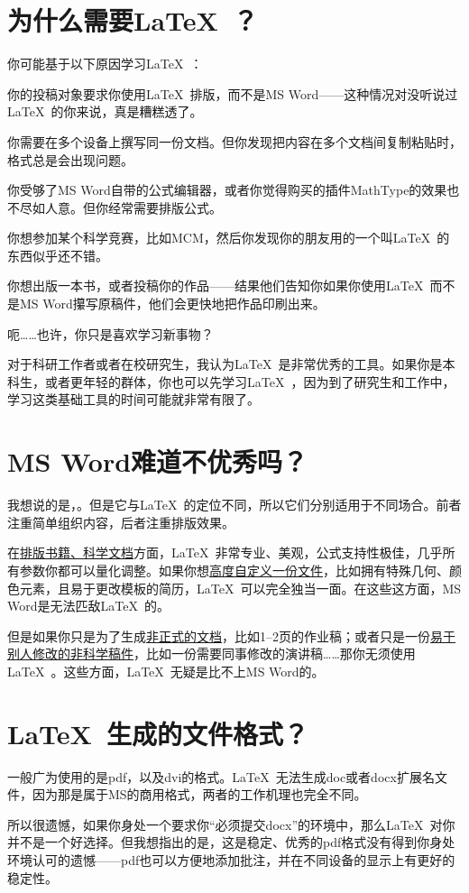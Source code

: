 \section{为什么需要\LaTeX\ ？}
你可能基于以下原因学习\LaTeX\ ：
\begin{feae}
\item 你的投稿对象要求你使用\LaTeX\ 排版，而不是MS Word——这种情况对没听说过\LaTeX\ 的你来说，真是糟糕透了。
\item 你需要在多个设备上撰写同一份文档。但你发现把内容在多个文档间复制粘贴时，格式总是会出现问题。
\item 你受够了MS Word自带的公式编辑器，或者你觉得购买的插件MathType的效果也不尽如人意。但你经常需要排版公式。
\item 你想参加某个科学竞赛，比如MCM，然后你发现你的朋友用的一个叫\LaTeX\ 的东西似乎还不错。
\item 你想出版一本书，或者投稿你的作品——结果他们告知你如果你使用\LaTeX\ 而不是MS Word攥写原稿件，他们会更快地把作品印刷出来。
\item 呃……也许，你只是喜欢学习新事物？
\end{feae}

对于科研工作者或者在校研究生，我认为\LaTeX\ 是非常优秀的工具。如果你是本科生，或者更年轻的群体，你也可以先学习\LaTeX\ ，因为到了研究生和工作中，学习这类基础工具的时间可能就非常有限了。

\section{MS Word难道不优秀吗？}
我想说的是，。但是它与\LaTeX\ 的定位不同，所以它们分别适用于不同场合。前者注重简单组织内容，后者注重排版效果。

在\uline{排版书籍、科学文档}方面，\LaTeX\ 非常专业、美观，公式支持性极佳，几乎所有参数你都可以量化调整。如果你想\uline{高度自定义一份文件}，比如拥有特殊几何、颜色元素，且易于更改模板的简历，\LaTeX\ 可以完全独当一面。在这些这方面，MS Word是无法匹敌\LaTeX\ 的。

但是如果你只是为了生成\uline{非正式的文档}，比如1--2页的作业稿；或者只是一份\uline{易于别人修改的非科学稿件}，比如一份需要同事修改的演讲稿……那你无须使用\LaTeX\ 。这些方面，\LaTeX\ 无疑是比不上MS Word的。

\section{\LaTeX\ 生成的文件格式？}
一般广为使用的是pdf，以及dvi的格式。\LaTeX\ 无法生成doc或者docx扩展名文件，因为那是属于MS的商用格式，两者的工作机理也完全不同。

所以很遗憾，如果你身处一个要求你“必须提交docx”的环境中，那么\LaTeX\ 对你并不是一个好选择。但我想指出的是，这是稳定、优秀的pdf格式没有得到你身处环境认可的遗憾——pdf也可以方便地添加批注，并在不同设备的显示上有更好的稳定性。